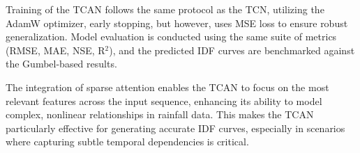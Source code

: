 \vspace{1em}

Training of the TCAN follows the same protocol as the TCN, utilizing the AdamW optimizer, early stopping, but however, uses MSE loss to ensure robust generalization. Model evaluation is conducted using the same suite of metrics (RMSE, MAE, NSE, R$^{2}$), and the predicted IDF curves are benchmarked against the Gumbel-based results.

\vspace{1em}

The integration of sparse attention enables the TCAN to focus on the most relevant features across the input sequence, enhancing its ability to model complex, nonlinear relationships in rainfall data. This makes the TCAN particularly effective for generating accurate IDF curves, especially in scenarios where capturing subtle temporal dependencies is critical.
